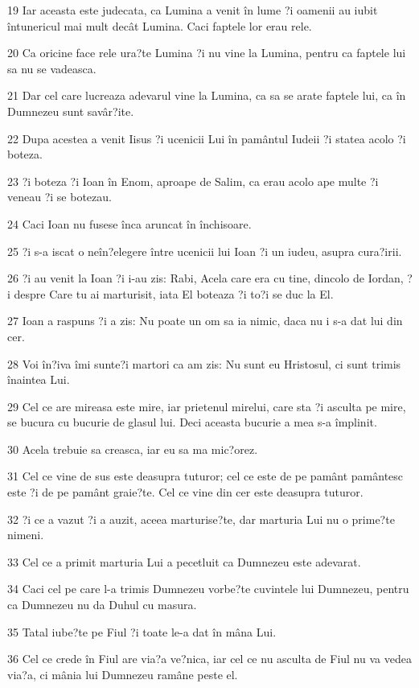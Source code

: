 \par 19 Iar aceasta este judecata, ca Lumina a venit în lume ?i oamenii au iubit întunericul mai mult decât Lumina. Caci faptele lor erau rele.
\par 20 Ca oricine face rele ura?te Lumina ?i nu vine la Lumina, pentru ca faptele lui sa nu se vadeasca.
\par 21 Dar cel care lucreaza adevarul vine la Lumina, ca sa se arate faptele lui, ca în Dumnezeu sunt savâr?ite.
\par 22 Dupa acestea a venit Iisus ?i ucenicii Lui în pamântul Iudeii ?i statea acolo ?i boteza.
\par 23 ?i boteza ?i Ioan în Enom, aproape de Salim, ca erau acolo ape multe ?i veneau ?i se botezau.
\par 24 Caci Ioan nu fusese înca aruncat în închisoare.
\par 25 ?i s-a iscat o neîn?elegere între ucenicii lui Ioan ?i un iudeu, asupra cura?irii.
\par 26 ?i au venit la Ioan ?i i-au zis: Rabi, Acela care era cu tine, dincolo de Iordan, ?i despre Care tu ai marturisit, iata El boteaza ?i to?i se duc la El.
\par 27 Ioan a raspuns ?i a zis: Nu poate un om sa ia nimic, daca nu i s-a dat lui din cer.
\par 28 Voi în?iva îmi sunte?i martori ca am zis: Nu sunt eu Hristosul, ci sunt trimis înaintea Lui.
\par 29 Cel ce are mireasa este mire, iar prietenul mirelui, care sta ?i asculta pe mire, se bucura cu bucurie de glasul lui. Deci aceasta bucurie a mea s-a împlinit.
\par 30 Acela trebuie sa creasca, iar eu sa ma mic?orez.
\par 31 Cel ce vine de sus este deasupra tuturor; cel ce este de pe pamânt pamântesc este ?i de pe pamânt graie?te. Cel ce vine din cer este deasupra tuturor.
\par 32 ?i ce a vazut ?i a auzit, aceea marturise?te, dar marturia Lui nu o prime?te nimeni.
\par 33 Cel ce a primit marturia Lui a pecetluit ca Dumnezeu este adevarat.
\par 34 Caci cel pe care l-a trimis Dumnezeu vorbe?te cuvintele lui Dumnezeu, pentru ca Dumnezeu nu da Duhul cu masura.
\par 35 Tatal iube?te pe Fiul ?i toate le-a dat în mâna Lui.
\par 36 Cel ce crede în Fiul are via?a ve?nica, iar cel ce nu asculta de Fiul nu va vedea via?a, ci mânia lui Dumnezeu ramâne peste el.

